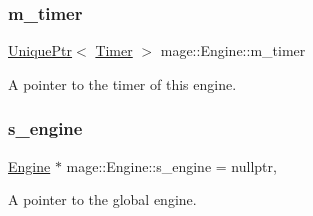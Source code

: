 \subsubsection{\texorpdfstring{m\+\_\+timer}{m\_timer}}
{\footnotesize\ttfamily \hyperlink{namespacemage_a3316d7143a973e37adf1110f2e80ca31}{Unique\+Ptr}$<$ \hyperlink{classmage_1_1_timer}{Timer} $>$ mage\+::\+Engine\+::m\+\_\+timer\hspace{0.3cm}{\ttfamily [private]}}

A pointer to the timer of this engine. \hypertarget{classmage_1_1_engine_a95fd10c9b9dfe0fc9cbbcb441c910240}{}\label{classmage_1_1_engine_a95fd10c9b9dfe0fc9cbbcb441c910240} 
\subsubsection{\texorpdfstring{s\+\_\+engine}{s\_engine}}
{\footnotesize\ttfamily \hyperlink{classmage_1_1_engine}{Engine} $\ast$ mage\+::\+Engine\+::s\+\_\+engine = nullptr\hspace{0.3cm}{\ttfamily [static]}, {\ttfamily [private]}}

A pointer to the global engine. 